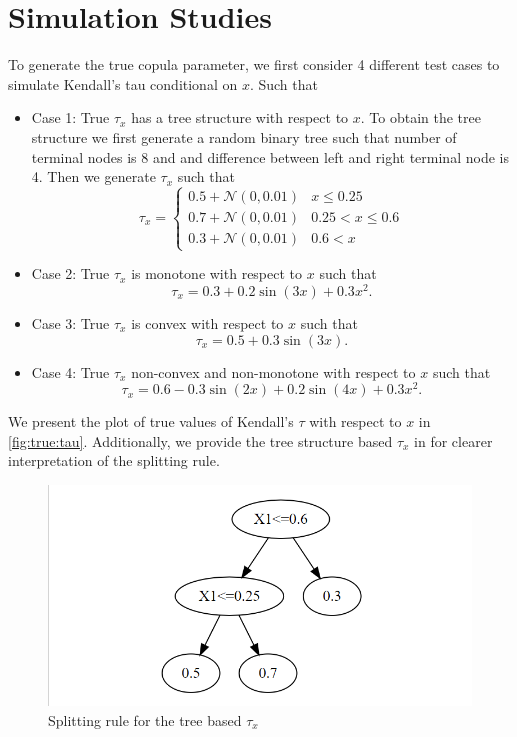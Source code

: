 \documentclass{amsart}
\begin{document}
\section{Simulation Studies}

To generate the true copula parameter, we first consider 4 different test cases to simulate Kendall's tau conditional on $x$. Such that

\begin{itemize}
	\item Case 1: True $\tau_x$ has a tree structure with respect to $x$. To obtain the tree structure we first generate a random binary tree such that number of terminal nodes is 8 and and difference between left and right terminal node is 4. Then we generate $\tau_x$ such that
	\begin{equation}
		\tau_x = \begin{cases}
			0.5 + \mathcal{N}(0,0.01) & x \le 0.25\\
			0.7 + \mathcal{N}(0,0.01) & 0.25 < x \le 0.6\\
			0.3 + \mathcal{N}(0,0.01) & 0.6 < x
		\end{cases}
	\end{equation}
	\item Case 2: True $\tau_x$ is monotone with respect to $x$ such that 
	\begin{equation}\label{eq:synth:tau_x:case2}
		\tau_x = 0.3 + 0.2 \sin(3x) + 0.3x^2.
	\end{equation}
	\item Case 3: True $\tau_x$ is convex with respect to $x$ such that 
	\begin{equation}\label{eq:synth:tau_x:case3}
		\tau_x = 0.5 + 0.3 \sin(3x).
	\end{equation}
	\item Case 4: True $\tau_x$ non-convex and non-monotone with respect to $x$ such that 
	\begin{equation}\label{eq:synth:tau_x:case4}
		\tau_x = 0.6 - 0.3 \sin(2x) + 0.2 \sin(4x) + 0.3 x^2.
	\end{equation}
\end{itemize}

We present the plot of true values of Kendall's $\tau$ with respect to $x$ in \cref{fig:true:tau}. Additionally, we provide the tree structure based $\tau_x$ in for clearer interpretation of the splitting rule.

\begin{figure}
	\centering
	\caption{Splitting rule for the tree based $\tau_x$}
	\label{fig:tau_tree_split}
	\includegraphics[width=0.5\linewidth]{tree_cond_tau_x.png}
\end{figure}
\end{document}
